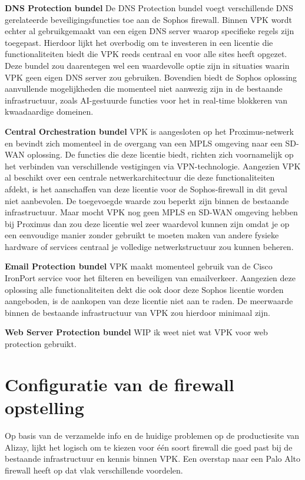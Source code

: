 \textbf{DNS Protection bundel}
De DNS Protection bundel voegt verschillende DNS gerelateerde beveiligingsfuncties toe aan de Sophos firewall. Binnen VPK wordt echter al gebruikgemaakt van een eigen DNS server waarop specifieke regels zijn toegepast. Hierdoor lijkt het overbodig om te investeren in een licentie die functionaliteiten biedt die VPK reeds centraal en voor alle sites heeft opgezet. Deze bundel zou daarentegen wel een waardevolle optie zijn in situaties waarin VPK geen eigen DNS server zou gebruiken. Bovendien biedt de Sophos oplossing aanvullende mogelijkheden die momenteel niet aanwezig zijn in de bestaande infrastructuur, zoals AI-gestuurde functies voor het in real-time blokkeren van kwaadaardige domeinen.


\textbf{Central Orchestration bundel}
VPK is aangesloten op het Proximus-netwerk en bevindt zich momenteel in de overgang van een MPLS omgeving naar een SD-WAN oplossing. De functies die deze licentie biedt, richten zich voornamelijk op het verbinden van verschillende vestigingen via VPN-technologie. Aangezien VPK al beschikt over een centrale netwerkarchitectuur die deze functionaliteiten afdekt, is het aanschaffen van deze licentie voor de Sophos-firewall in dit geval niet aanbevolen. De toegevoegde waarde zou beperkt zijn binnen de bestaande infrastructuur. Maar mocht VPK nog geen MPLS en SD-WAN omgeving hebben bij Proximus dan zou deze licentie wel zeer waardevol kunnen zijn omdat je op een eenvoudige manier zonder gebruikt te moeten maken van andere fysieke hardware of services centraal je volledige netwerkstructuur zou kunnen beheren.


\textbf{Email Protection bundel}
VPK maakt momenteel gebruik van de Cisco IronPort service voor het filteren en beveiligen van emailverkeer. Aangezien deze oplossing alle functionaliteiten dekt die ook door deze Sophos licentie worden aangeboden, is de aankopen van deze licentie niet aan te raden. De meerwaarde binnen de bestaande infrastructuur van VPK zou hierdoor minimaal zijn.


\textbf{Web Server Protection bundel}
WIP ik weet niet wat VPK voor web protection gebruikt.




\chapter{Configuratie van de firewall opstelling}
\label{ch:configFW}

Op basis van de verzamelde info en de huidige problemen op de productiesite van Alizay, lijkt het logisch om te kiezen voor één soort firewall die goed past bij de bestaande infrastructuur en kennis binnen VPK. Een overstap naar een Palo Alto firewall heeft op dat vlak verschillende voordelen.

